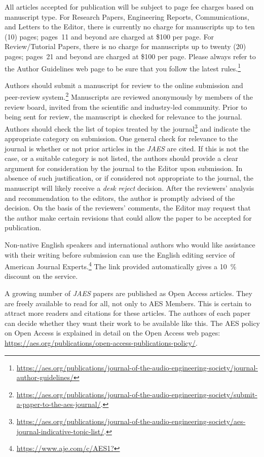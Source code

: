 \documentclass[fleqn]{jaes}
\begin{document}
All articles accepted for publication will be subject to page fee charges based on manuscript type. For Research Papers, Engineering Reports, Communications, and Letters to the Editor, there is currently no charge for manuscripts up to ten (10) pages; pages~11 and beyond are charged at \$100 per page. For Review/Tutorial Papers, there is no charge for manuscripts up to twenty (20) pages; pages~21 and beyond are charged at \$100 per page. Please always refer to the Author Guidelines web page to be sure that you follow the latest rules.\footnote{\url{https://aes.org/publications/journal-of-the-audio-engineering-society/journal-author-guidelines/}}

Authors should submit a manuscript for review to the online submission and peer-review system.\footnote{\url{https://aes.org/publications/journal-of-the-audio-engineering-society/submit-a-paper-to-the-aes-journal/}.} Manuscripts are reviewed anonymously by members of the review board, invited from the scientific and industry-led community. 
Prior to being sent for review, the manuscript is checked for relevance to the journal. Authors should check the list of topics treated by the journal\footnote{\url{https://aes.org/publications/journal-of-the-audio-engineering-society/aes-journal-indicative-topic-list/}.} and indicate the appropriate category on submission. One general check for relevance to the journal is whether or not prior articles in the \emph{JAES} are cited. If this is not the case, or a suitable category is not listed, the authors should provide a clear argument for consideration by the journal to the Editor upon submission. In absence of such justification, or if considered not appropriate to the journal, the manuscript will likely receive a \emph{desk reject} decision. 
After the reviewers’ analysis and recommendation to the editors, the author is promptly advised of the decision. On the basis of the reviewers’ comments, the Editor may request that the author make certain revisions that could allow the paper to be accepted for publication.

Non-native English speakers and international authors who would like assistance with their writing before submission can use the English editing service of American Journal Experts.\footnote{\url{https://www.aje.com/c/AES1?}} The link
provided automatically gives a \SI{10}{\percent} discount on the service.

A growing number of \emph{JAES} papers are published as Open Access articles. They are freely available to read for all, not only to AES Members. This is certain to attract more readers and citations for these articles. The authors of each paper can decide whether they want their work to be available like this. The AES policy on Open Access is explained in detail on the Open Access web pages: \url{https://aes.org/publications/open-access-publications-policy/}.
\end{document}

